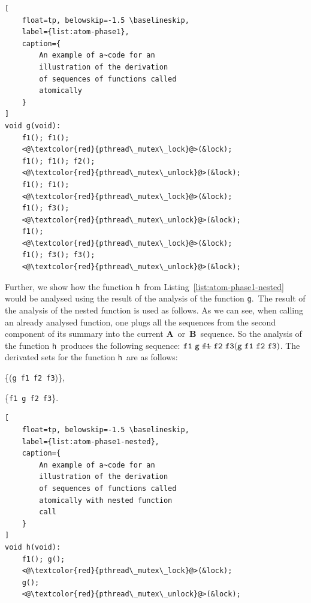 \documentclass{ExcelAtFIT}
\begin{document}
\begin{lstlisting}[
    float=tp, belowskip=-1.5 \baselineskip,
    label={list:atom-phase1},
    caption={
        An example of a~code for an
        illustration of the derivation
        of sequences of functions called
        atomically
    }
]
void g(void):
    f1(); f1();
    <@\textcolor{red}{pthread\_mutex\_lock}@>(&lock);
    f1(); f1(); f2();
    <@\textcolor{red}{pthread\_mutex\_unlock}@>(&lock);
    f1(); f1();
    <@\textcolor{red}{pthread\_mutex\_lock}@>(&lock);
    f1(); f3();
    <@\textcolor{red}{pthread\_mutex\_unlock}@>(&lock);
    f1();
    <@\textcolor{red}{pthread\_mutex\_lock}@>(&lock);
    f1(); f3(); f3();
    <@\textcolor{red}{pthread\_mutex\_unlock}@>(&lock);
\end{lstlisting}

Further, we show how the function
\texttt{h}~from Listing~\ref{list:atom-phase1-nested}
would be analysed using the result of the analysis of
the function \texttt{g}.~The result of the analysis
of the nested function is used as follows. As we can
see, when calling an already analysed function, one
plugs all the sequences from the second component
of its summary into the current
\textbf{A}~or~\textbf{B}~sequence.
So the analysis of the function
\texttt{h}~produces the following sequence:
$
    \text{\texttt{f1} \texttt{g} \sout{\texttt{f1}} \texttt{f2} \texttt{f3}}
    (\text{\texttt{g} \texttt{f1} \texttt{f2} \texttt{f3}})
$.
The derivated sets for the
function \texttt{h}~are as follows:
\begin{enumerate*}[label={(\roman*)}, topsep=0.4em]
    \item
        \{(\texttt{g}~\texttt{f1}~\texttt{f2}~\texttt{f3})\},

    \item
        \{\texttt{f1}~\texttt{g}~\texttt{f2}~\texttt{f3}\}.
\end{enumerate*}

\begin{lstlisting}[
    float=tp, belowskip=-1.5 \baselineskip,
    label={list:atom-phase1-nested},
    caption={
        An example of a~code for an
        illustration of the derivation
        of sequences of functions called
        atomically with nested function
        call
    }
]
void h(void):
    f1(); g();
    <@\textcolor{red}{pthread\_mutex\_lock}@>(&lock);
    g();
    <@\textcolor{red}{pthread\_mutex\_unlock}@>(&lock);
\end{lstlisting}
\end{document}
